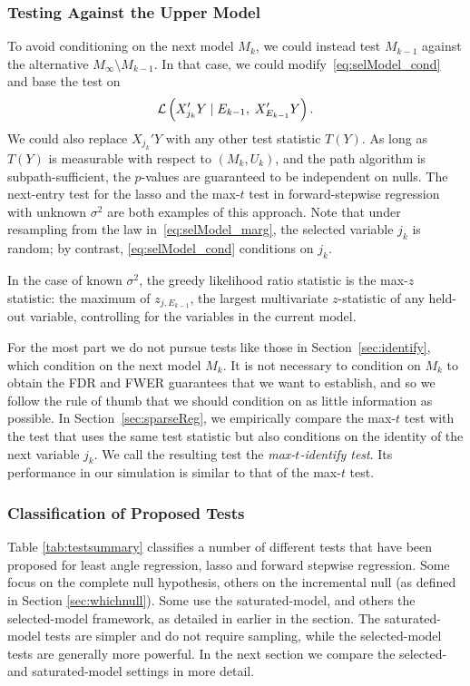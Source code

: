 \documentclass{article}
\begin{document}
\subsubsection{Testing Against the Upper Model}


To avoid conditioning on the next model $M_k$, we could instead test $M_{k-1}$ against the alternative $M_{\infty}\setminus M_{k-1}$. In that case, we could modify~\eqref{eq:selModel_cond} and base the test on
\begin{equation}\label{eq:selModel_marg}
\mathcal{L}\left(X_{j_k}'Y \mid E_{k-1}, \; X_{E_{k-1}}'Y\right).
\end{equation}
We could also replace $X_{j_k}'Y$ with any other test statistic $T(Y)$. As long as $T(Y)$ is measurable with respect to $(M_k, U_k)$, and the path algorithm is subpath-sufficient, the $p$-values are guaranteed to be independent on nulls. The next-entry test for the lasso and the max-$t$ test in forward-stepwise regression with unknown $\sigma^2$ are both examples of this approach. Note that under resampling from the law in~\eqref{eq:selModel_marg}, the selected variable $j_k$ is random; by contrast, \eqref{eq:selModel_cond} conditions on $j_k$.

In the case of known $\sigma^2$, the greedy likelihood ratio statistic is the max-$z$ statistic: the maximum of $z_{j,E_{k-1}}$, the largest multivariate $z$-statistic of any held-out variable, controlling for the variables in the current model.

For the most part we do not pursue tests like those in Section~\ref{sec:identify}, which condition on the next model $M_k$. It is not necessary to condition on $M_k$ to obtain the FDR and FWER guarantees that we want to establish, and so we follow the rule of thumb that we should condition on as little information as possible. In Section~\ref{sec:sparseReg}, we empirically compare the max-$t$ test with the test that uses the same test statistic but also conditions on the identity of the next variable $j_k$. We call the resulting test the {\em max-$t$-identify test}. Its performance in our simulation is similar to that of the max-$t$ test.

\subsubsection{Classification of Proposed Tests}
Table \ref{tab:testsummary} classifies a number of different tests that have been proposed for least angle regression, lasso and forward stepwise regression. Some focus on the complete null hypothesis, others on the incremental null (as defined in Section \ref{sec:whichnull}).
Some use the saturated-model, and others the selected-model framework, as detailed in earlier in the section.
The saturated-model tests are simpler and do not require sampling, while the selected-model tests are generally more powerful. In the next section we compare the selected- and saturated-model settings in more detail.
\end{document}
